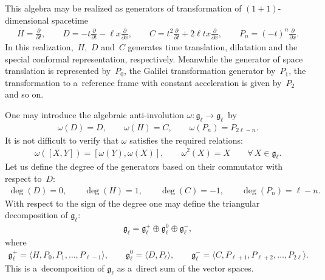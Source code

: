 \documentclass[pdftex]{sigma}
\numberwithin{equation}{section}
\begin{document}
This algebra may be realized as generators of transformation of $(1+1)$-dimensional spacetime
\begin{gather*}
H = \frac{\partial}{\partial t},
\qquad
D =-t\frac{\partial}{\partial t} -\ell x \frac{\partial}{\partial x},
\qquad
C = t^2 \frac{\partial}{\partial t} + 2 \ell tx \frac{\partial}{\partial x},
\qquad
P_n = (-t)^n \frac{\partial}{\partial x}.
\end{gather*}
In this realization,~$H$,~$D$ and~$C$ generates time translation, dilatation and the special conformal representation,
respectively.
Meanwhile the generator of space translation is represented by~$P_0$, the Galilei transformation generator by~$P_1$,
the transformation to a~reference frame with constant acceleration is given by~$P_2$ and so on.

One may introduce the algebraic anti-involution $ \omega: {\mathfrak g}_{\ell} \to {\mathfrak g}_{\ell} $~by
\begin{gather*}
\omega(D) = D, \qquad \omega(H) = C, \qquad \omega(P_n) = P_{2\ell-n}.
\end{gather*}
It is not dif\/f\/icult to verify that $ \omega $ satisf\/ies the required relations:
\begin{gather*}
\omega([X,Y]) = [\omega(Y), \omega(X)], \qquad \omega^2(X) = X \qquad  \forall\, X \in {\mathfrak g}_{\ell}.
\end{gather*}
Let us def\/ine the degree of the generators based on their commutator with respect to~$D$:
\begin{gather*}
\deg(D) = 0, \qquad \deg(H) = 1, \qquad \deg(C) = -1, \qquad \deg(P_n) = \ell-n.
\end{gather*}
With respect to the sign of the degree one may def\/ine the triangular decomposition of ${\mathfrak g}_{\ell}$:
\begin{gather*}
    {\mathfrak g}_{\ell} = {\mathfrak g}_{\ell}^+ \oplus {\mathfrak g}_{\ell}^0 \oplus {\mathfrak g}_{\ell}^-,
\end{gather*}
where
\begin{gather*}
{\mathfrak g}_{\ell}^+ = \langle H, P_0, P_1, \dots, P_{\ell-1} \rangle,
\qquad
{\mathfrak g}_{\ell}^0 = \langle D, P_{\ell} \rangle,
\qquad
{\mathfrak g}_{\ell}^- = \langle C, P_{\ell+1}, P_{\ell+2}, \dots, P_{2\ell} \rangle.
\end{gather*}
This is a~decomposition of $ {\mathfrak g}_{\ell} $ as a~direct sum of the vector spaces.
\end{document}
